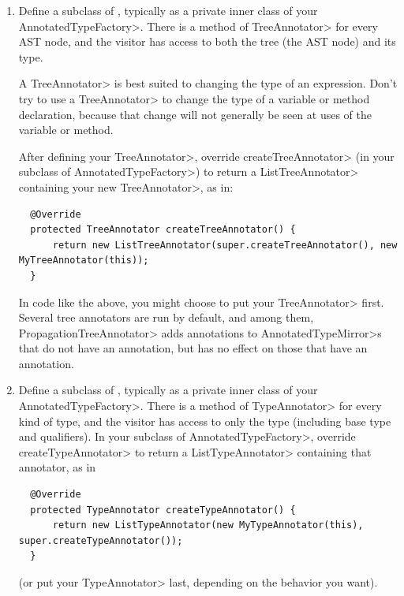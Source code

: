 \begin{enumerate}
\item
  Define a subclass of
  ,
  typically as a private inner class of your \<AnnotatedTypeFactory>.
  There is a method of \<TreeAnnotator> for every AST node, and the visitor
  has access to both the tree (the AST node) and its type.

  A \<TreeAnnotator> is best suited to changing the type of an expression.
  Don't try to use a \<TreeAnnotator> to change the type of a variable or
  method declaration, because that change will not generally be seen at
  uses of the variable or method.

  After defining your \<TreeAnnotator>, override \<createTreeAnnotator> (in
  your subclass of \<AnnotatedTypeFactory>) to return a
  \<ListTreeAnnotator> containing your new \<TreeAnnotator>, as in:

\begin{Verbatim}
  @Override
  protected TreeAnnotator createTreeAnnotator() {
      return new ListTreeAnnotator(super.createTreeAnnotator(), new MyTreeAnnotator(this));
  }
\end{Verbatim}

  \noindent
  In code like the above, you might choose to put your \<TreeAnnotator> first.
  Several tree annotators are run by
  default, and among them, \<PropagationTreeAnnotator>
  adds annotations to \<AnnotatedTypeMirror>s that do not have an annotation,
  but has no effect on those that have an annotation.

\item
  Define a subclass of
  ,
  typically as a private inner class of your \<AnnotatedTypeFactory>.
  There is a method of \<TypeAnnotator> for every kind of type, and the
  visitor has access to only the type (including base type and
  qualifiers).  In your subclass of
  \<AnnotatedTypeFactory>, override \<createTypeAnnotator> to return a
  \<ListTypeAnnotator> containing that annotator, as in

\begin{Verbatim}
  @Override
  protected TypeAnnotator createTypeAnnotator() {
      return new ListTypeAnnotator(new MyTypeAnnotator(this), super.createTypeAnnotator());
  }
\end{Verbatim}

  \noindent
  (or put your \<TypeAnnotator> last, depending on the behavior you want).


\end{enumerate}
